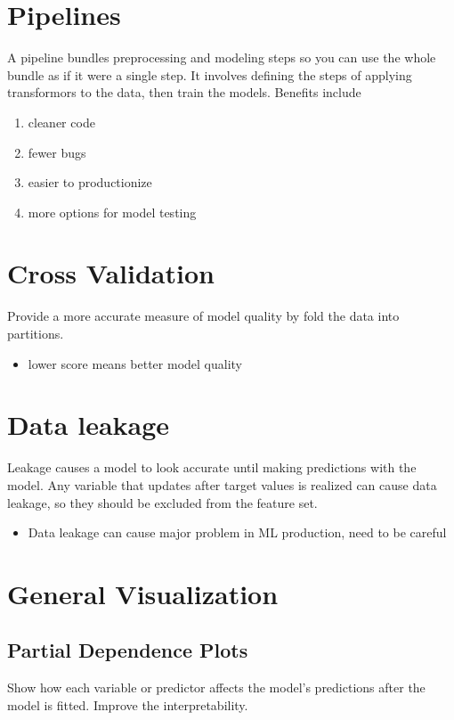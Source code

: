 \documentclass[11pt]{article}
\begin{document}
\section{Pipelines}
\label{sec:org614771f}
A pipeline bundles preprocessing and modeling steps so you can use the whole bundle as if it were a single step. It involves defining the steps of applying transformors to the data, then train the models. Benefits include
\begin{enumerate}
\item cleaner code
\item fewer bugs
\item easier to productionize
\item more options for model testing
\end{enumerate}

\section{Cross Validation}
\label{sec:orgd8d3598}
Provide a more accurate measure of model quality by fold the data into partitions.
\begin{itemize}
\item lower score means better model quality
\end{itemize}

\section{Data leakage}
\label{sec:org697ab45}
Leakage causes a model to look accurate until making predictions with the model. Any variable that updates after target values is realized can cause data leakage, so they should be excluded from the feature set. 
\begin{itemize}
\item Data leakage can cause major problem in ML production, need to be careful
\end{itemize}

\section{General Visualization}
\label{sec:org4bd89a0}
\subsection{Partial Dependence Plots}
\label{sec:orgcecec05}
Show how each variable or predictor affects the model's predictions after the model is fitted. Improve the interpretability.   
\end{document}
